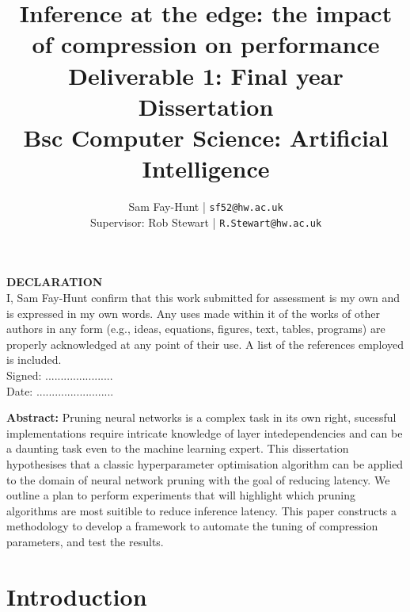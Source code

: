 \documentclass[11pt]{article}
\begin{document}
\title{%
	\bf Inference at the edge: the impact of compression on performance\\ 
	\large Deliverable 1: Final year Dissertation \\
	Bsc Computer Science: Artificial Intelligence}

\author{
	Sam Fay-Hunt | \texttt{sf52@hw.ac.uk}\\
	Supervisor: Rob Stewart | \texttt{R.Stewart@hw.ac.uk}
}

\maketitle
\thispagestyle{empty}
\pagebreak

\textbf{DECLARATION}\\
I, Sam Fay-Hunt confirm that this work submitted for assessment is my own and is expressed in
my own words. Any uses made within it of the works of other authors in any form (e.g., ideas,
equations, figures, text, tables, programs) are properly acknowledged at any point of their
use. A list of the references employed is included.\\
Signed: ......................\\
Date: .........................
\thispagestyle{empty}
\pagebreak

\textbf{Abstract:} 
Pruning neural networks is a complex task in its own right, sucessful implementations require intricate knowledge of layer intedependencies and can be a daunting task even to the machine learning expert. 
This dissertation hypothesises that a classic hyperparameter optimisation algorithm can be applied to the domain of neural network pruning with the goal of reducing latency. 
We outline a plan to perform experiments that will highlight which pruning algorithms are most suitible to reduce inference latency.
This paper constructs a methodology to develop a framework to automate the tuning of compression parameters, and test the results. 




\thispagestyle{empty}
\pagebreak

\tableofcontents
\thispagestyle{empty}
\pagebreak

\printnoidxglossary[type=acronym, nonumberlist]
\thispagestyle{empty}

\newpage
\setcounter{page}{1}

\section{Introduction}

\end{document}
